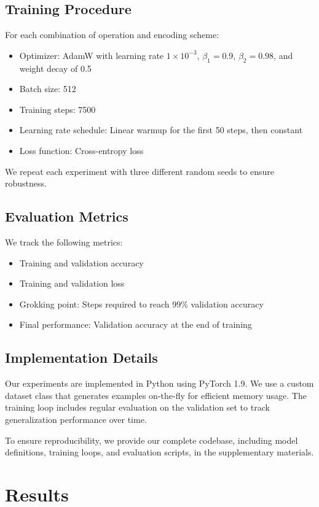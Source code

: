 \documentclass{article} %
\begin{document}
\subsection{Training Procedure}
For each combination of operation and encoding scheme:
\begin{itemize}
    \item Optimizer: AdamW with learning rate $1 \times 10^{-3}$, $\beta_1 = 0.9$, $\beta_2 = 0.98$, and weight decay of 0.5
    \item Batch size: 512
    \item Training steps: 7500
    \item Learning rate schedule: Linear warmup for the first 50 steps, then constant
    \item Loss function: Cross-entropy loss
\end{itemize}

We repeat each experiment with three different random seeds to ensure robustness.

\subsection{Evaluation Metrics}
We track the following metrics:
\begin{itemize}
    \item Training and validation accuracy
    \item Training and validation loss
    \item Grokking point: Steps required to reach 99\% validation accuracy
    \item Final performance: Validation accuracy at the end of training
\end{itemize}

\subsection{Implementation Details}
Our experiments are implemented in Python using PyTorch 1.9. We use a custom dataset class that generates examples on-the-fly for efficient memory usage. The training loop includes regular evaluation on the validation set to track generalization performance over time.

To ensure reproducibility, we provide our complete codebase, including model definitions, training loops, and evaluation scripts, in the supplementary materials.

\section{Results}
\label{sec:results}
\end{document}
